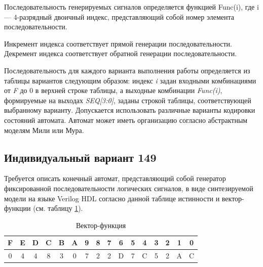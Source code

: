 \documentclass[a4paper,14pt]{extarticle}
\begin{document}
Последовательность генерируемых сигналов определяется функцией Func(i), где i --- 4-разрядный двоичный индекс, представляющий собой номер элемента
последовательности.

Инкремент индекса соответствует прямой генерации последовательности.
Декремент индекса соответствует обратной генерации последовательности.

Последовательность для каждого варианта выполнения работы определяется из
таблицы вариантов следующим образом: индекс \textit{i} задан входными комбинациями от \textit{F} до
0 в верхней строке таблицы, а выходные комбинации \textit{Func(i)}, формируемые на выходах
\textit{SEQ[3:0]}, заданы строкой таблицы, соответствующей выбранному варианту.
Допускается использовать различные варианты кодировки состояний автомата.
Автомат может иметь организацию согласно абстрактным моделям Мили или Мура.

\subsection {Индивидуальный вариант 149}
Требуется описать конечный автомат, представляющий собой генератор
фиксированной последовательности логических сигналов, в виде синтезируемой модели
на языке Verilog HDL согласно данной таблице истинности и вектор-функции (см. таблицу \ref{tab:func-vector}).

\begin{table}[htbp]
	\begin{center}
	\begin{tabular}{|c|c|c|c|c|c|c|c|c|c|c|c|c|c|c|c|}
		\hline
		F & E & D & C & B & A & 9 & 8 & 7 & 6 & 5 & 4 & 3 & 2 & 1 & 0 \\ \hline\hline
		0 & 4 & 4 & 8 & 3 & 0 & 7 & 2 & 2 & D & 7 & C & 5 & 2 & A & C \\ \hline
	\end{tabular}
	\caption{Вектор-функция}
	\label{tab:func-vector}
\end{center}
\end{table}
\end{document}
